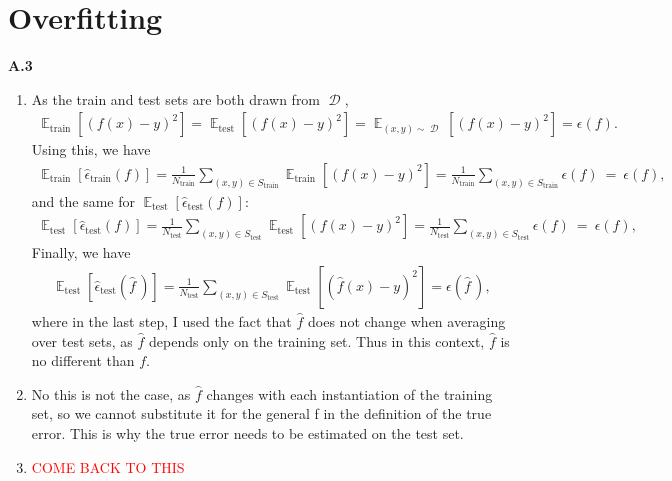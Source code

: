 \documentclass{article}
\newcommand{\note}[1]{\textsf{\textcolor{Red}{#1}}}
\DeclareMathOperator{\E}{\mathbb{E}}
\DeclareMathOperator{\D}{\mathcal{D}}
\begin{document}
\section*{Overfitting}

\textbf{A.3}
\begin{enumerate}
        \item
        As the train and test sets are both drawn from $\D$, 
        \begin{align*}
                \E_\text{train} \left[ (f(x) - y)^2 \right] 
                = \E_\text{test} \left[ (f(x) - y)^2 \right] 
                = \E_{(x,y) \sim \D} \left[ (f(x) - y)^2 \right]
                = \epsilon(f).
        \end{align*}
        Using this, we have
        \begin{align*}
                \E_\text{train} [\hat{\epsilon}_\text{train} (f)]
                = \frac{1}{N_\text{train}} \sum_{(x,y) \in S_\text{train}} \E_\text{train} \left[ (f(x) - y)^2 \right]
                = \frac{1}{N_\text{train}} \sum_{(x,y) \in S_\text{train}} \epsilon(f)
                ~ = ~ \epsilon(f),
        \end{align*}
        and the same for $\E_\text{test}[\hat{\epsilon}_\text{test}(f)]$:
        \begin{align*}
                \E_\text{test} [\hat{\epsilon}_\text{test} (f)]
                = \frac{1}{N_\text{test}} \sum_{(x,y) \in S_\text{test}} \E_\text{test} \left[ (f(x) - y)^2 \right]
                = \frac{1}{N_\text{test}} \sum_{(x,y) \in S_\text{test}} \epsilon(f)
                ~ = ~ \epsilon(f),
        \end{align*}
        Finally, we have
        \begin{align*}
                \E_\text{test}[\hat{\epsilon}_\text{test}(\hat{f}\,)]
                = \frac{1}{N_\text{test}} \sum_{(x,y) \in S_\text{test}} \E_\text{test} \left[ (\hat{f}(x) - y)^2 \right] = \epsilon(\hat{f}\,),
        \end{align*}
        where in the last step, I used the fact that $\hat{f}$ does not change when averaging over test sets, as $\hat{f}$ depends only on the training set.
        Thus in this context, $\hat{f}$ is no different than $f$.

        \item
        No this is not the case, as $\hat{f}$ changes with each instantiation of the training set, so we cannot substitute it for the general f in the definition of the true error.
        This is why the true error needs to be estimated on the test set.

        \item
        \note{COME BACK TO THIS}

\end{enumerate}
\end{document}
